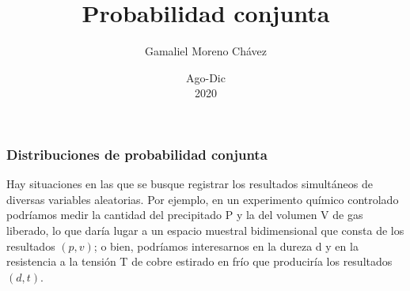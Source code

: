 \documentclass[spanish]{beamer}
\begin{document}
\title{Probabilidad conjunta}
\author{Gamaliel Moreno Chávez}
\date{Ago-Dic\\ 2020}%

\frame{\titlepage}

\begin{frame}
\frametitle{Distribuciones de probabilidad conjunta}
Hay situaciones en las que se busque registrar los resultados simultáneos de
diversas variables aleatorias. Por ejemplo, en un experimento químico controlado podríamos medir la cantidad del precipitado P y la del volumen V de gas liberado, lo que daría lugar a un espacio muestral bidimensional que consta de los resultados $(p, v)$; o bien, podríamos interesarnos en la dureza d y en la resistencia a la tensión T de cobre estirado en frío que produciría los resultados $(d, t)$.
\end{frame}
\end{document}
